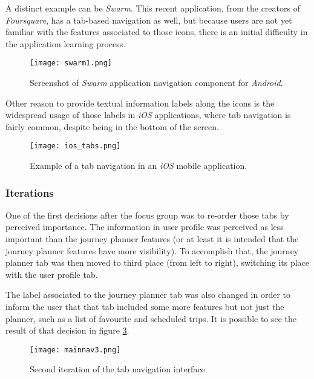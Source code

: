 A distinct example can be \emph{Swarm}. This recent application, from the creators of \emph{Foursquare}, has a tab-based navigation as well, but because users are not yet familiar with the features associated to those icons, there is an initial difficulty in the application learning process.

\clearpage

\begin{figure}[htb]
  \begin{center}
    \leavevmode
    \texttt{[image: swarm1.png]}
    \caption{Screenshot of \emph{Swarm} application navigation component for \emph{Android}.}
    \label{fig:swarm1}
  \end{center}
\end{figure}



Other reason to provide textual information labels along the icons is the widespread usage of those labels in \emph{iOS} applications, where tab navigation is fairly common, despite being in the bottom of the screen.

\begin{figure}[h!]
  \begin{center}
    \leavevmode
    \texttt{[image: ios\_tabs.png]}
    \caption{Example of a tab navigation in an \emph{iOS} mobile application.}
    \label{fig:ios-tabs}
  \end{center}
\end{figure}


\subsubsection{Iterations}

One of the first decisions after the focus group was to re-order those tabs by perceived importance. The information in user profile was perceived as less important than the journey planner features (or at least it is intended that the journey planner features have more visibility). To accomplish that, the journey planner tab was then moved to third place (from left to right), switching its place with the user profile tab.

The label associated to the journey planner tab was also changed in order to inform the user that that tab included some more features but not just the planner, such as a list of favourite and scheduled trips.
It is possible to see the result of that decision in figure \ref{fig:mainnav3}.


\begin{figure}[h!]
  \begin{center}
    \leavevmode
    \texttt{[image: mainnav3.png]}
    \caption{Second iteration of the tab navigation interface.}
    \label{fig:mainnav3}
  \end{center}
\end{figure}

